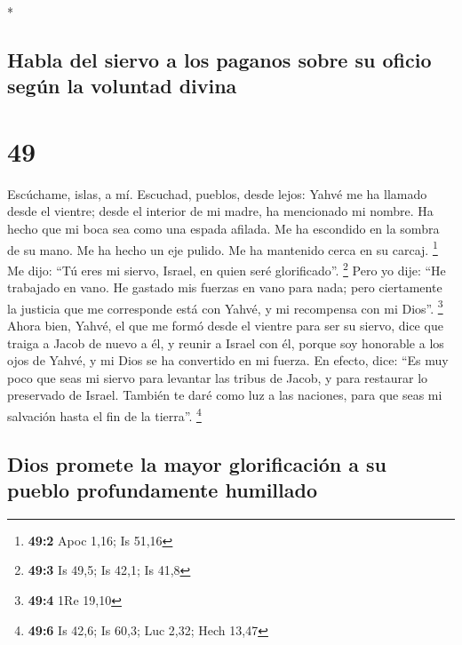 \begin{paracol}{2}
\begin{otherlanguage}{english}
\end{otherlanguage}

\switchcolumn[0]*

\hypertarget{habla-del-siervo-a-los-paganos-sobre-su-oficio-seguxfan-la-voluntad-divina}{%
\subsection{Habla del siervo a los paganos sobre su oficio según la
voluntad
divina}\label{habla-del-siervo-a-los-paganos-sobre-su-oficio-seguxfan-la-voluntad-divina}}

\hypertarget{section-96}{%
\section{49}\label{section-96}}

 Escúchame, islas, a mí. Escuchad, pueblos, desde lejos:
Yahvé me ha llamado desde el vientre; desde el interior de mi madre, ha
mencionado mi nombre.  Ha hecho que mi boca sea como una
espada afilada. Me ha escondido en la sombra de su mano. Me ha hecho un
eje pulido. Me ha mantenido cerca en su carcaj. \footnote{\textbf{49:2}
  Apoc 1,16; Is 51,16}  Me dijo: ``Tú eres mi siervo,
Israel, en quien seré glorificado''. \footnote{\textbf{49:3} Is 49,5; Is
  42,1; Is 41,8}  Pero yo dije: ``He trabajado en vano. He
gastado mis fuerzas en vano para nada; pero ciertamente la justicia que
me corresponde está con Yahvé, y mi recompensa con mi Dios''.
\footnote{\textbf{49:4} 1Re 19,10}  Ahora bien, Yahvé, el
que me formó desde el vientre para ser su siervo, dice que traiga a
Jacob de nuevo a él, y reunir a Israel con él, porque soy honorable a
los ojos de Yahvé, y mi Dios se ha convertido en mi fuerza.
 En efecto, dice: ``Es muy poco que seas mi siervo para
levantar las tribus de Jacob, y para restaurar lo preservado de Israel.
También te daré como luz a las naciones, para que seas mi salvación
hasta el fin de la tierra''. \footnote{\textbf{49:6} Is 42,6; Is 60,3;
  Luc 2,32; Hech 13,47}

\hypertarget{dios-promete-la-mayor-glorificaciuxf3n-a-su-pueblo-profundamente-humillado}{%
\subsection{Dios promete la mayor glorificación a su pueblo
profundamente
humillado}\label{dios-promete-la-mayor-glorificaciuxf3n-a-su-pueblo-profundamente-humillado}}


\end{paracol}
